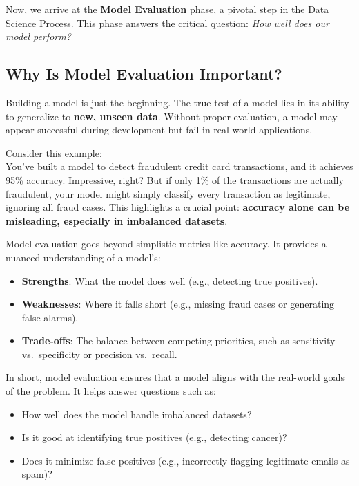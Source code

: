 \documentclass[
]{book}
\providecommand{\tightlist}{%
  \setlength{\itemsep}{0pt}\setlength{\parskip}{0pt}}
\theoremstyle{definition}
\theoremstyle{definition}
\theoremstyle{definition}
\theoremstyle{definition}
\theoremstyle{remark}
\begin{document}
Now, we arrive at the \textbf{Model Evaluation} phase, a pivotal step in the Data Science Process. This phase answers the critical question: \emph{How well does our model perform?}

\subsection*{Why Is Model Evaluation Important?}\label{why-is-model-evaluation-important}

Building a model is just the beginning. The true test of a model lies in its ability to generalize to \textbf{new, unseen data}. Without proper evaluation, a model may appear successful during development but fail in real-world applications.

Consider this example:\\
You've built a model to detect fraudulent credit card transactions, and it achieves 95\% accuracy. Impressive, right? But if only 1\% of the transactions are actually fraudulent, your model might simply classify every transaction as legitimate, ignoring all fraud cases. This highlights a crucial point: \textbf{accuracy alone can be misleading, especially in imbalanced datasets}.

Model evaluation goes beyond simplistic metrics like accuracy. It provides a nuanced understanding of a model's:

\begin{itemize}
\tightlist
\item
  \textbf{Strengths}: What the model does well (e.g., detecting true positives).\\
\item
  \textbf{Weaknesses}: Where it falls short (e.g., missing fraud cases or generating false alarms).\\
\item
  \textbf{Trade-offs}: The balance between competing priorities, such as sensitivity vs.~specificity or precision vs.~recall.
\end{itemize}

In short, model evaluation ensures that a model aligns with the real-world goals of the problem. It helps answer questions such as:

\begin{itemize}
\tightlist
\item
  How well does the model handle imbalanced datasets?\\
\item
  Is it good at identifying true positives (e.g., detecting cancer)?\\
\item
  Does it minimize false positives (e.g., incorrectly flagging legitimate emails as spam)?
\end{itemize}
\end{document}

